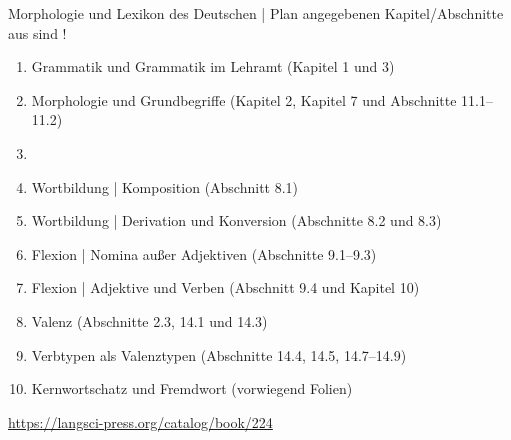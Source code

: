 \begin{frame}
  {Morphologie und Lexikon des Deutschen | Plan}
   angegebenen Kapitel\slash Abschnitte aus  sind !\\
  \Halbzeile
  \begin{enumerate}
    \item Grammatik und Grammatik im Lehramt (Kapitel 1 und 3)
    \item Morphologie und Grundbegriffe (Kapitel 2, Kapitel 7 und Abschnitte 11.1--11.2)
    \item {}
    \item Wortbildung | Komposition (Abschnitt 8.1)
    \item Wortbildung | Derivation und Konversion (Abschnitte 8.2 und 8.3)
    \item Flexion | Nomina außer Adjektiven (Abschnitte 9.1--9.3)
    \item Flexion | Adjektive und Verben (Abschnitt 9.4 und Kapitel 10)
    \item Valenz (Abschnitte 2.3, 14.1 und 14.3)
    \item Verbtypen als Valenztypen (Abschnitte 14.4, 14.5, 14.7--14.9) 
    \item Kernwortschatz und Fremdwort (vorwiegend Folien)
  \end{enumerate}
  \Halbzeile
  \centering 
  \url{https://langsci-press.org/catalog/book/224}
\end{frame}


